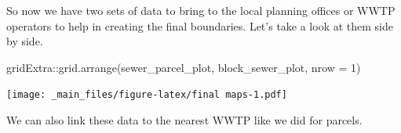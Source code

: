 \documentclass[
]{book}
\newenvironment{Shaded}{\begin{snugshade}}{\end{snugshade}}
\newcommand{\AttributeTok}[1]{\textcolor[rgb]{0.77,0.63,0.00}{#1}}
\newcommand{\DecValTok}[1]{\textcolor[rgb]{0.00,0.00,0.81}{#1}}
\newcommand{\FunctionTok}[1]{\textcolor[rgb]{0.00,0.00,0.00}{#1}}
\newcommand{\NormalTok}[1]{#1}
\newcommand{\SpecialCharTok}[1]{\textcolor[rgb]{0.00,0.00,0.00}{#1}}
\begin{document}
So now we have two sets of data to bring to the local planning offices or WWTP operators to help in creating the final boundaries. Let's take a look at them side by side.

\begin{Shaded}
\begin{Highlighting}[]
\NormalTok{gridExtra}\SpecialCharTok{::}\FunctionTok{grid.arrange}\NormalTok{(sewer\_parcel\_plot, block\_sewer\_plot, }\AttributeTok{nrow =} \DecValTok{1}\NormalTok{)}
\end{Highlighting}
\end{Shaded}

\texttt{[image: \_main\_files/figure-latex/final maps-1.pdf]}

We can also link these data to the nearest WWTP like we did for parcels.
\end{document}

